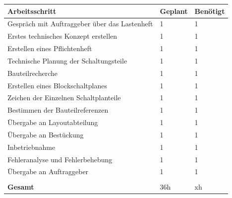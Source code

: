 \documentclass[a4paper,11pt]{scrartcl}
\begin{document}
\begin{tabularx}{\textwidth}{p{}|  p{} | p{}}

\textbf{Arbeitsschritt} 	&	\textbf{Geplant}	&	\textbf{Benötigt}	\\

\hline

Gespräch mit Auftraggeber über das Lastenheft	&	1	&	1\\

\hline

Erstes technisches Konzept erstellen			&	1	&	1\\

\hline

Erstellen eines Pflichtenheft					&	1	&	1\\

\hline 

Technische Planung der Schaltungsteile			&	1	&	1\\

\hline 

Bauteilrecherche  								&	1	&	1\\

\hline

Erstellen eines Blockschaltplanes				&	1	&	1\\

\hline

Zeichen der Einzelnen Schaltplanteile			&	1	&	1\\

\hline 

Bestimmen der Bauteilreferenzen					&	1	&	1\\

\hline

Übergabe an Layoutabteilung						&	1	&	1\\

\hline

Übergabe an Bestückung							&	1	&	1\\

\hline

Inbetriebnahme									&	1	&	1\\

\hline

Fehleranalyse und Fehlerbehebung				&	1	&	1\\

\hline 

Übergabe an Auftraggeber						&	1	&	1\\

&&\\

\textbf{Gesamt}	&	36h		&	xh

\end{tabularx}
\renewcommand{\arraystretch}{1}
\end{document}
